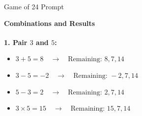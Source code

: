 \documentclass[aspectratio=169, xcolor={dvipsnames}, 10pt, brazil]{beamer}
\begin{document}
\begin{frame}{Game of 24 Prompt}
\centering
\begin{tcolorbox}[
    colback=gray!5!white, colframe=black!50!white,
    title=Propose Prompt Continue,
    fonttitle=\bfseries, rounded corners, boxrule=1mm,
    width=\textwidth
]


\textbf{Combinations and Results}\\
\\
\textbf{1. Pair \(3\) and \(5\):}

\begin{itemize}
    \item \(3 + 5 = 8 \quad \rightarrow \quad \text{Remaining: } 8, 7, 14\)
    \item \(3 - 5 = -2 \quad \rightarrow \quad \text{Remaining: } -2, 7, 14\)
    \item \(5 - 3 = 2 \quad \rightarrow \quad \text{Remaining: } 2, 7, 14\)
    \item \(3 \times 5 = 15 \quad \rightarrow \quad \text{Remaining: } 15, 7, 14\)
\end{itemize}

\end{tcolorbox}

\end{frame}
\end{document}
